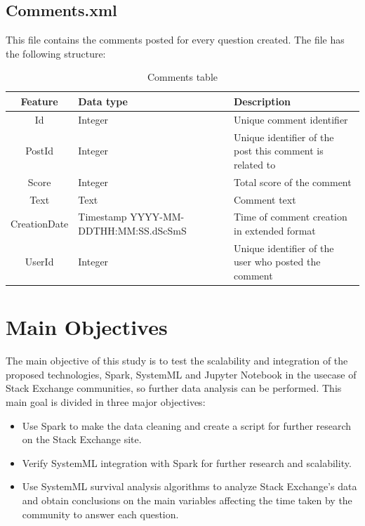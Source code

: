 \documentclass[11pt]{book} %
\begin{document}
    \subsection{Comments.xml}

      This file contains the comments posted for every question created. The file has the following structure:

      \begin{table}[!ht]
        \centering
        \begin{tabular}{|c|p{}|p{}|}
          \hline

          Feature & Data type & Description \\ \hline
          Id & Integer & Unique comment identifier \\ \hline
          PostId & Integer & Unique identifier of the post this comment is related to \\ \hline
          Score & Integer & Total score of the comment \\ \hline
          Text & Text & Comment text \\ \hline
          CreationDate & Timestamp YYYY-MM-DDTHH:MM:SS.dScSmS & Time of comment creation in extended format \\ \hline
          UserId & Integer & Unique identifier of the user who posted the comment \\

          \hline
        \end{tabular}
        \caption{Comments table}
        \label{tab:comments}
      \end{table}

\newpage

  \section{Main Objectives}

    The main objective of this study is to test the scalability and integration of the proposed technologies, Spark, SystemML and Jupyter Notebook in the usecase of Stack Exchange communities, so further data analysis can be performed. This main goal is divided in three major objectives:

    \begin{itemize}

      \item Use Spark to make the data cleaning and create a script for further research on the Stack Exchange site.

      \item Verify SystemML integration with Spark for further research and scalability.

      \item Use SystemML survival analysis algorithms to analyze Stack Exchange's data and obtain conclusions on the main variables affecting the time taken by the community to answer each question.

    \end{itemize}
\end{document}
